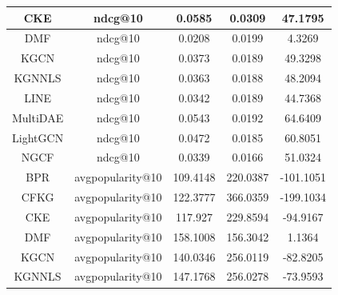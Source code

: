 \begin{table}[H]
{\begin{tabular}{|c|c|c|c|c|}
    CKE              & ndcg@10           & 0.0585                        & 0.0309                          & 47.1795                               \\ \hline
    DMF              & ndcg@10           & 0.0208                        & 0.0199                          & 4.3269                                \\ \hline
    KGCN             & ndcg@10           & 0.0373                        & 0.0189                          & 49.3298                               \\ \hline
    KGNNLS           & ndcg@10           & 0.0363                        & 0.0188                          & 48.2094                               \\ \hline
    LINE             & ndcg@10           & 0.0342                        & 0.0189                          & 44.7368                               \\ \hline
    MultiDAE         & ndcg@10           & 0.0543                        & 0.0192                          & 64.6409                               \\ \hline
    LightGCN         & ndcg@10           & 0.0472                        & 0.0185                          & 60.8051                               \\ \hline
    NGCF             & ndcg@10           & 0.0339                        & 0.0166                          & 51.0324                               \\ \hline
    BPR              & avgpopularity@10 & 109.4148                      & 220.0387                        & -101.1051                             \\ \hline
    CFKG             & avgpopularity@10 & 122.3777                      & 366.0359                        & -199.1034                             \\ \hline
    CKE              & avgpopularity@10 & 117.927                       & 229.8594                        & -94.9167                              \\ \hline
    DMF              & avgpopularity@10 & 158.1008                      & 156.3042                        & 1.1364                                \\ \hline
    KGCN             & avgpopularity@10 & 140.0346                      & 256.0119                        & -82.8205                              \\ \hline
    KGNNLS           & avgpopularity@10 & 147.1768                      & 256.0278                        & -73.9593                              \\ \hline

\end{tabular}}
\end{table}
